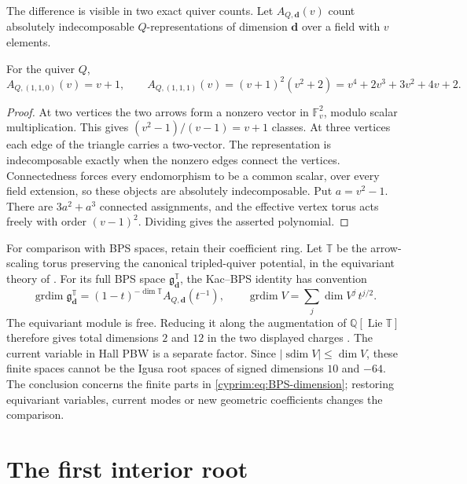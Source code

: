 The difference is visible in two exact quiver counts. Let
$A_{Q,\mathbf d}(v)$ count absolutely indecomposable
$Q$-representations of dimension $\mathbf d$ over a field with
$v$ elements.

\begin{proposition}\label{cyprim:prop:kac}
For the quiver $Q$,
\[
 A_{Q,(1,1,0)}(v)=v+1,
 \qquad
 A_{Q,(1,1,1)}(v)=(v+1)^2(v^2+2)
   =v^4+2v^3+3v^2+4v+2.
\]
\end{proposition}

\begin{proof}
At two vertices the two arrows form a nonzero vector in
$\mathbb F_v^2$, modulo scalar multiplication. This gives
$(v^2-1)/(v-1)=v+1$ classes. At three vertices each edge of
the triangle carries a two-vector. The representation is
indecomposable exactly when the nonzero edges connect the
vertices. Connectedness forces every endomorphism to be a
common scalar, over every field extension, so these objects
are absolutely indecomposable. Put $a=v^2-1$. There are
$3a^2+a^3$ connected assignments, and the effective vertex
torus acts freely with order $(v-1)^2$. Dividing gives the
asserted polynomial.
\end{proof}

For comparison with BPS spaces, retain their coefficient ring.
Let $\mathbb T$ be the arrow-scaling torus preserving the
canonical tripled-quiver potential, in the equivariant theory
of \cite[\S~1.4]{rewriteJN2026}.
For its full BPS space $\mathfrak g^{\mathbb T}_{\mathbf d}$,
the Kac--BPS identity has convention
\begin{equation}\label{cyprim:eq:BPS-dimension}
 \operatorname{grdim}\mathfrak g^{\mathbb T}_{\mathbf d}
 =(1-t)^{-\dim\mathbb T}A_{Q,\mathbf d}(t^{-1}),
 \qquad \operatorname{grdim}V=\sum_j\dim V^j\,t^{j/2}.
\end{equation}
The equivariant module is free. Reducing it along the
augmentation of $\mathbb Q[\operatorname{Lie}\mathbb T]$
therefore gives total dimensions $2$ and $12$ in the two
displayed charges \cite[\S~1.4, after~(19)]{rewriteJN2026}.
The current variable in Hall PBW is a separate factor.
Since $|\operatorname{sdim}V|\le\dim V$, these finite spaces
cannot be the Igusa root spaces of signed dimensions $10$
and $-64$. The conclusion concerns the finite parts in
\eqref{cyprim:eq:BPS-dimension}; restoring equivariant variables,
current modes or new geometric coefficients changes the comparison.

\section{The first interior root}
\label{cyprim:sec:root}

